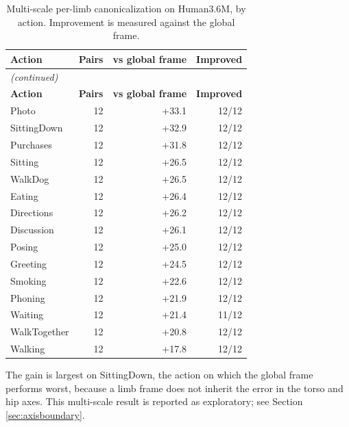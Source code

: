 \begin{center}
{\fontsize{10}{12}\selectfont
\begin{longtable}{lrrr}
\caption{Multi-scale per-limb canonicalization on Human3.6M, by action. Improvement is measured against the global frame.}\label{tab:appms}\\
\hline
\textbf{Action} & \textbf{Pairs} & \textbf{vs global frame} & \textbf{Improved} \\
\hline
\endfirsthead
\multicolumn{4}{l}{\textit{(continued)}}\\
\hline
\textbf{Action} & \textbf{Pairs} & \textbf{vs global frame} & \textbf{Improved} \\
\hline
\endhead
\hline
\endfoot
Photo & 12 & +33.1 & 12/12 \\
SittingDown & 12 & +32.9 & 12/12 \\
Purchases & 12 & +31.8 & 12/12 \\
Sitting & 12 & +26.5 & 12/12 \\
WalkDog & 12 & +26.5 & 12/12 \\
Eating & 12 & +26.4 & 12/12 \\
Directions & 12 & +26.2 & 12/12 \\
Discussion & 12 & +26.1 & 12/12 \\
Posing & 12 & +25.0 & 12/12 \\
Greeting & 12 & +24.5 & 12/12 \\
Smoking & 12 & +22.6 & 12/12 \\
Phoning & 12 & +21.9 & 12/12 \\
Waiting & 12 & +21.4 & 11/12 \\
WalkTogether & 12 & +20.8 & 12/12 \\
Walking & 12 & +17.8 & 12/12 \\
\end{longtable}
}
\end{center}
\noindent The gain is largest on SittingDown, the action on which the global frame performs worst, because a limb frame does not inherit the error in the torso and hip axes. This multi-scale result is reported as exploratory; see Section \ref{sec:axisboundary}.

\vspace{0.6cm}

